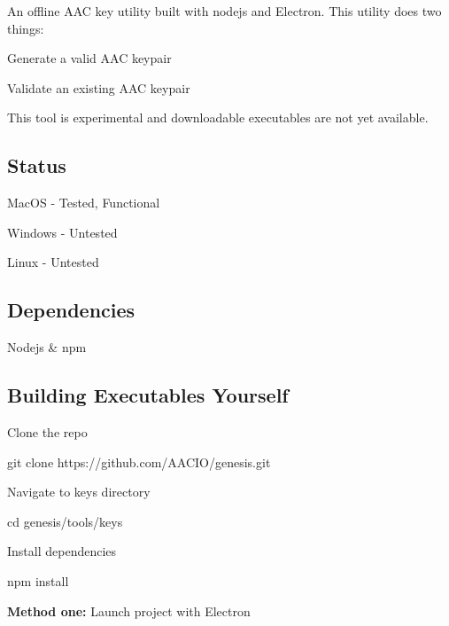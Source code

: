 

An offline A\+AC key utility built with nodejs and Electron. This utility does two things\+:


\begin{DoxyItemize}
\item Generate a valid A\+AC keypair
\item Validate an existing A\+AC keypair
\end{DoxyItemize}

This tool is experimental and downloadable executables are not yet available.

\subsection*{Status}


\begin{DoxyItemize}
\item Mac\+OS -\/ Tested, Functional
\item Windows -\/ Untested
\item Linux -\/ Untested
\end{DoxyItemize}

\subsection*{Dependencies}


\begin{DoxyItemize}
\item Nodejs \& npm
\end{DoxyItemize}

\subsection*{Building Executables Yourself}

Clone the repo


\begin{DoxyCode}
git clone https://github.com/AACIO/genesis.git
\end{DoxyCode}


Navigate to keys directory


\begin{DoxyCode}
cd genesis/tools/keys
\end{DoxyCode}


Install dependencies 
\begin{DoxyCode}
npm install
\end{DoxyCode}


{\bfseries Method one\+:} Launch project with Electron



